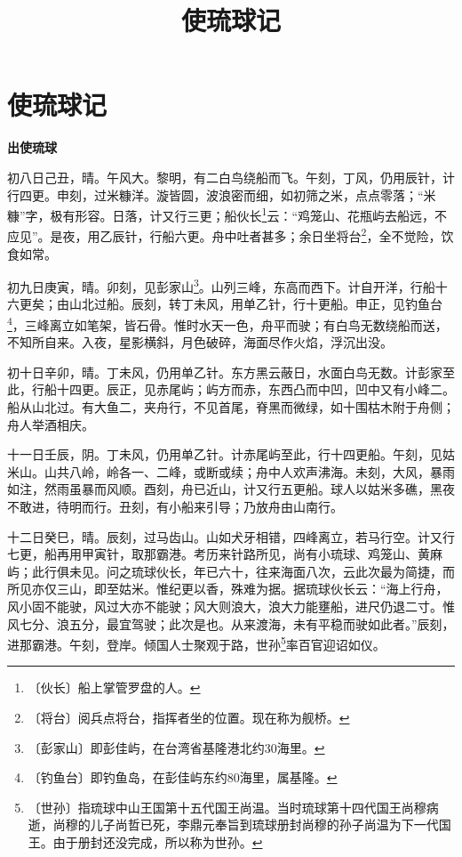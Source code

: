 \documentclass[12pt,UTF-8,openany]{ctexbook}
\title{\zihao{0} \bfseries 使琉球记}
\author{}
\date{}
\begin{document}
\maketitle
\tableofcontents
\newpage

\chapter{使琉球记}

\begin{normalsize}
    
    \begin{center}{\Large\textbf{出使琉球}}\end{center}
    
    初八日己丑，晴。午风大。黎明，有二白鸟绕船而飞。午刻，丁风，仍用辰针，计行四更。申刻，过米糠洋。漩皆圆，波浪密而细，如初筛之米，点点零落；“米糠”字，极有形容。日落，计又行三更；船伙长\footnote{〔伙长〕船上掌管罗盘的人。}云：“鸡笼山、花瓶屿去船远，不应见”。是夜，用乙辰针，行船六更。舟中吐者甚多；余日坐将台\footnote{〔将台〕阅兵点将台，指挥者坐的位置。现在称为舰桥。}，全不觉险，饮食如常。
    
    初九日庚寅，晴。卯刻，见彭家山\footnote{〔彭家山〕即彭佳屿，在台湾省基隆港北约30海里。}。山列三峰，东高而西下。计自开洋，行船十六更矣；由山北过船。辰刻，转丁未风，用单乙针，行十更船。申正，见钓鱼台\footnote{〔钓鱼台〕即钓鱼岛，在彭佳屿东约80海里，属基隆。}，三峰离立如笔架，皆石骨。惟时水天一色，舟平而驶；有白鸟无数绕船而送，不知所自来。入夜，星影横斜，月色破碎，海面尽作火焰，浮沉出没。
    
    初十日辛卯，晴。丁未风，仍用单乙针。东方黑云蔽日，水面白鸟无数。计彭家至此，行船十四更。辰正，见赤尾屿；屿方而赤，东西凸而中凹，凹中又有小峰二。船从山北过。有大鱼二，夹舟行，不见首尾，脊黑而微绿，如十围枯木附于舟侧；舟人举酒相庆。
    
    十一日壬辰，阴。丁未风，仍用单乙针。计赤尾屿至此，行十四更船。午刻，见姑米山。山共八岭，岭各一、二峰，或断或续；舟中人欢声沸海。未刻，大风，暴雨如注，然雨虽暴而风顺。酉刻，舟已近山，计又行五更船。球人以姑米多礁，黑夜不敢进，待明而行。丑刻，有小船来引导；乃放舟由山南行。
    
    十二日癸巳，晴。辰刻，过马齿山。山如犬牙相错，四峰离立，若马行空。计又行七更，船再用甲寅针，取那霸港。考历来针路所见，尚有小琉球、鸡笼山、黄麻屿；此行俱未见。问之琉球伙长，年已六十，往来海面八次，云此次最为简捷，而所见亦仅三山，即至姑米。惟纪更以香，殊难为据。据琉球伙长云：“海上行舟，风小固不能驶，风过大亦不能驶；风大则浪大，浪大力能壅船，进尺仍退二寸。惟风七分、浪五分，最宜驾驶；此次是也。从来渡海，未有平稳而驶如此者。”辰刻，进那霸港。午刻，登岸。倾国人士聚观于路，世孙\footnote{〔世孙〕指琉球中山王国第十五代国王尚温。当时琉球第十四代国王尚穆病逝，尚穆的儿子尚哲已死，李鼎元奉旨到琉球册封尚穆的孙子尚温为下一代国王。由于册封还没完成，所以称为世孙。}率百官迎诏如仪。
    

\end{normalsize}
\end{document}
